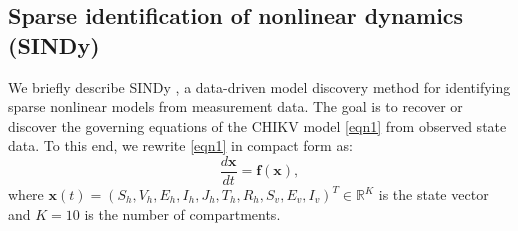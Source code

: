 \documentclass[9pt]{article}
\newcommand\bff{\mathbf{f}}
\newcommand\bfx{\mathbf{x}}
\numberwithin{equation}{section}
\begin{document}
\subsection{Sparse identification of nonlinear dynamics (SINDy)}\label{SINDy}
We briefly describe SINDy \cite{brunton}, a data-driven model discovery method for identifying sparse nonlinear models from measurement data. The goal is to recover or discover the governing equations of the CHIKV model \eqref{eqn1} from observed state data. To this end, we rewrite \eqref{eqn1} in compact form as:
\begin{equation}\label{eqn3}
    \frac{d\bfx}{dt}=\bff(\bfx),
\end{equation}
where $\bfx(t) = (S_h, V_h, E_h, I_h, J_h, T_h, R_h, S_v, E_v, I_v)^T \in \mathbb{R}^{K}$ is the state vector and $K = 10$ is the number of compartments.
\end{document}
